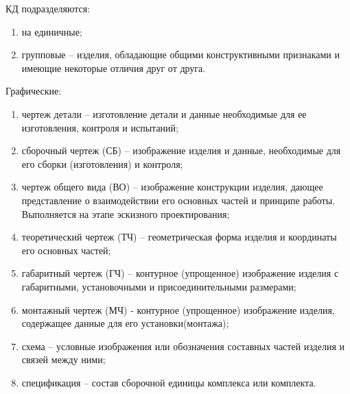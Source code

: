 \documentclass[unicode, 12pt, a4paper, oneside]{article}
\begin{document}
КД подразделяются:
\begin{enumerate}
\item на единичные;
\item групповые – изделия, обладающие общими конструктивными признаками и имеющие некоторые отличия друг от друга.
\end{enumerate}

Графические:
\begin{enumerate}
\item чертеж детали – изготовление детали и данные необходимые для ее изготовления, контроля и испытаний;
\item сборочный чертеж (СБ) – изображение изделия и данные, необходимые для его сборки (изготовления) и контроля;
\item чертеж общего вида (ВО) – изображение конструкции изделия, дающее представление о взаимодействии его основных частей и принципе работы. Выполняется на этапе эскизного проектирования;
\item теоретический чертеж (ТЧ) – геометрическая форма изделия и координаты его основных частей;
\item габаритный чертеж (ГЧ) – контурное (упрощенное) изображение изделия с габаритными, установочными и присоединительными размерами;
\item монтажный чертеж (МЧ) - контурное (упрощенное) изображение изделия, содержащее данные для его установки(монтажа);
\item схема – условные изображения или обозначения составных частей изделия и связей между ними;
\item спецификация – состав сборочной единицы комплекса или комплекта.
\end{enumerate}
\end{document}
